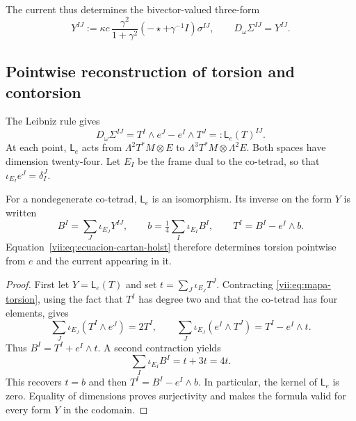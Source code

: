 The current thus determines the bivector-valued three-form
\begin{equation}
 Y^{IJ}:=\kappa c\,
   \frac{\gamma^2}{1+\gamma^2}
   (-\star+\gamma^{-1}I)\sigma^{IJ},
 \qquad D_\omega\Sigma^{IJ}=Y^{IJ}.
 \label{vii:eq:corriente-dualizada}
\end{equation}

\subsection{Pointwise reconstruction of torsion and contorsion}
\label{vii:subsec:reconstruccion-torsion}

The Leibniz rule gives
\begin{equation}
 D_\omega\Sigma^{IJ}
 =T^I\wedge e^J-e^I\wedge T^J
 =:\mathsf L_e(T)^{IJ}.
 \label{vii:eq:mapa-torsion}
\end{equation}
At each point, \(\mathsf L_e\) acts from
\(\Lambda^2T^*M\otimes E\) to
\(\Lambda^3T^*M\otimes\Lambda^2E\). Both spaces have dimension
twenty-four. Let \(E_I\) be the frame dual to the co-tetrad, so
that \(\iota_{E_I}e^J=\delta_I^J\).

\begin{theorem}
\label{vii:thm:inversion-torsion}
For a nondegenerate co-tetrad, \(\mathsf L_e\) is an isomorphism.
Its inverse on the form \(Y\) is written
\begin{equation}
 B^I=\sum_J\iota_{E_J}Y^{IJ},\qquad
 b=\tfrac14\sum_I\iota_{E_I}B^I,\qquad
 T^I=B^I-e^I\wedge b.
 \label{vii:eq:torsion-explicita}
\end{equation}
Equation~\eqref{vii:eq:ecuacion-cartan-holst} therefore determines
torsion pointwise from \(e\) and the current appearing in it.
\end{theorem}
\begin{proof}
First let \(Y=\mathsf L_e(T)\) and set
\(t=\sum_J\iota_{E_J}T^J\). Contracting
\eqref{vii:eq:mapa-torsion}, using the fact that \(T^I\) has
degree two and that the co-tetrad has four elements, gives
\[
 \sum_J\iota_{E_J}(T^I\wedge e^J)=2T^I,
 \qquad
 \sum_J\iota_{E_J}(e^I\wedge T^J)=T^I-e^I\wedge t.
\]
Thus \(B^I=T^I+e^I\wedge t\). A second contraction yields
\[
 \sum_I\iota_{E_I}B^I=t+3t=4t.
\]
This recovers \(t=b\) and then \(T^I=B^I-e^I\wedge b\).
In particular, the kernel of \(\mathsf L_e\) is zero. Equality
of dimensions proves surjectivity and makes the formula valid for
every form \(Y\) in the codomain.
\end{proof}

